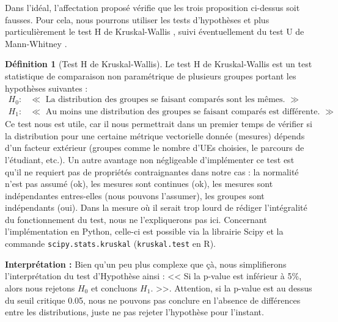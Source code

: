 \documentclass{rapport}
\theoremstyle{definition}
\newtheorem{definition}{Définition}
\theoremstyle{remark}
\theoremstyle{definition}
\theoremstyle{remark}
\begin{document}
Dans l'idéal, l'affectation proposé vérifie que les trois proposition ci-dessus soit fausses. Pour cela, nous pourrons utiliser les tests d'hypothèses et plus particulièrement le test H de Kruskal-Wallis \cite{Kruskal1952}, suivi éventuellement du test U de Mann-Whitney \cite{Whitney1947}.
\begin{definition}[Test H de Kruskal-Wallis]
    Le test H de Kruskal-Wallis est un test statistique de comparaison non paramétrique de plusieurs groupes portant les hypothèses suivantes :
    $$
    \begin{matrix}
        H_0 : & \ll\text{ La distribution des groupes se faisant comparés sont les mêmes. } \gg\\
        H_1 : & \ll\text{ Au moins une distribution des groupes se faisant comparés est différente. }\gg
    \end{matrix}
    $$
    Ce test nous est utile, car il nous permettrait dans un premier temps de vérifier si la distribution pour une certaine métrique vectorielle donnée (mesures) dépends d'un facteur extérieur (groupes comme le nombre d'UEs choisies, le parcours de l'étudiant, etc.).
    Un autre avantage non négligeable d'implémenter ce test est qu'il ne requiert pas de propriétés contraignantes dans notre cas : la normalité n'est pas assumé (ok), les mesures sont continues (ok), les mesures sont indépendantes entres-elles (nous pouvons l'assumer), les groupes sont indépendants (oui).
    Dans la mesure où il serait trop lourd de rédiger l'intégralité du fonctionnement du test, nous ne l'expliquerons pas ici. Concernant l'implémentation en Python, celle-ci est possible via la librairie Scipy et la commande \texttt{scipy.stats.kruskal} (\texttt{kruskal.test} en R).

    \textbf{Interprétation :} Bien qu'un peu plus complexe que çà, nous simplifierons l'interprétation du test d'Hypothèse ainsi : << Si la p-value est inférieur à 5\%, alors nous rejetons $H_0$ et concluons $H_1$. >>. Attention, si la p-value est au dessus du seuil critique 0.05, nous ne pouvons pas conclure en l'absence de différences entre les distributions, juste ne pas rejeter l'hypothèse pour l'instant.
\end{definition}
\end{document}
